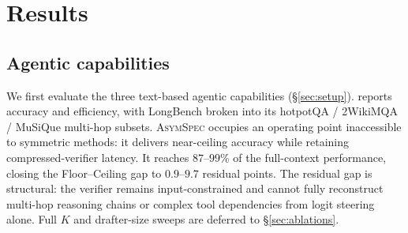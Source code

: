\documentclass[11pt]{article}
\theoremstyle{plain}
\theoremstyle{definition}
\begin{document}
\section{Results}
\label{sec:results}
\subsection{Agentic capabilities}
\label{sec:results-text}

\begin{table}[t]
\centering
\footnotesize
\setlength{\tabcolsep}{4pt}
\caption{Accuracy and efficiency on isolated agentic capabilities ($K{=}2$). \textsc{AsymSpec} closes $59$--$94\%$ of the Floor--Ceiling gap on long-context multi-hop QA and tool use, at $0.23\times$ the Ceiling's compute---a trade-off point inaccessible to symmetric SD or SCD. Speedup and FLOPs are averaged across the three text benchmarks; FLOPs follow the parameters $\times$ token-ratio convention. Drafter-alone accuracy across drafter sizes is in . Metric definitions in \S\ref{sec:metrics}; per-benchmark FLOPs in .}
\label{tab:main}
\end{table}

We first evaluate the three text-based agentic capabilities (\S\ref{sec:setup}).  reports accuracy and efficiency, with LongBench broken into its hotpotQA / 2WikiMQA / MuSiQue multi-hop subsets. \textsc{AsymSpec} occupies an operating point inaccessible to symmetric methods: it delivers near-ceiling accuracy while retaining compressed-verifier latency. It reaches $87$--$99\%$ of the full-context performance, closing the Floor--Ceiling gap to $0.9$--$9.7$ residual points. The residual gap is structural: the verifier remains input-constrained and cannot fully reconstruct multi-hop reasoning chains or complex tool dependencies from logit steering alone. Full $K$ and drafter-size sweeps are deferred to \S\ref{sec:ablations}.
\end{document}
